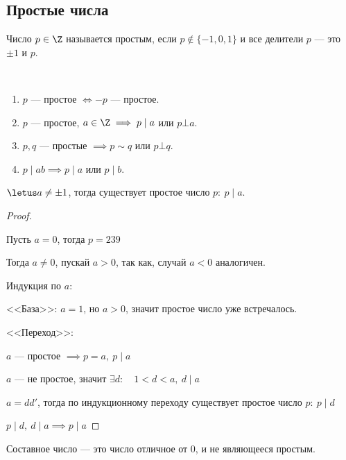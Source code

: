 \subsection{Простые числа}

\begin{defn}
    Число $p \in \Z$ называется простым, если $p \notin \{-1, 0, 1\}$ и все делители $p$ --- это $\pm 1$ и $p$.
\end{defn}

\begin{prop}~
    \begin{enumerate}
        \item $p$ --- простое $\iff -p$ --- простое.
        
        \item $p$ --- простое, $a \in \Z \implies p \mid a$ или $p \bot a$.
        
        \item $p, q$ --- простые $\implies p \sim q$ или $p \bot q$.
        
        \item $p \mid ab \implies p \mid a$ или $p \mid b$. 
    \end{enumerate}
\end{prop}

\begin{theorem-non}
    $\letus a \neq \pm 1$, тогда существует простое число $p :\ p \mid a$.
\end{theorem-non}

\begin{proof}~

    Пусть $a = 0$, тогда $p = 239$
    
    Тогда $a \neq 0$, пускай $a > 0$, так как, случай $a < 0$ аналогичен.
    
    Индукция по $a$:

    <<База>>: $a = 1$, но $a > 0$, значит простое число уже встречалось.
    
    <<Переход>>:
    
    $a$ --- простое $\implies p = a,~ p \mid a$
    
    $a$ --- не простое, значит $\exists d :\quad 1 < d < a,~ d \mid a$
    
    $a = dd'$, тогда по индукционному переходу существует простое число $p :\ p \mid d$
    
    $p \mid d,~d \mid a \implies p \mid a$
\end{proof}

\begin{defn}
    Составное число --- это число отличное от 0, и не являющееся простым.
\end{defn}

